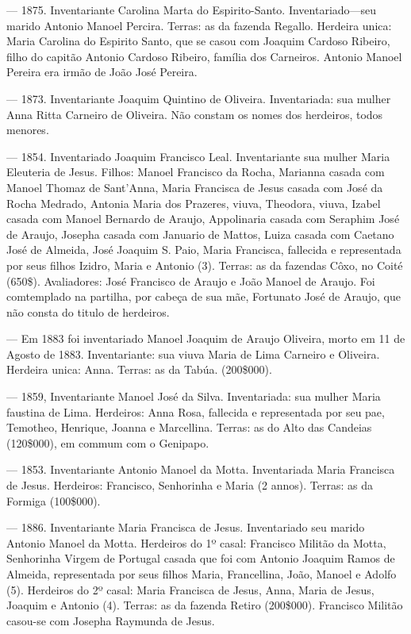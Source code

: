 — 1875. Inventariante Carolina Marta do Espirito-Santo. Inventariado—seu marido Antonio Manoel Percira. Terras: as da fazenda Regallo. Herdeira unica: Maria Carolina do Espirito Santo, que se casou com Joaquim Cardoso Ribeiro, filho do capitão Antonio Cardoso Ribeiro, família dos Carneiros. Antonio Manoel Pereira era irmão de João José Pereira.

— 1873. Inventariante Joaquim Quintino de Oliveira. Inventariada: sua mulher Anna Ritta Carneiro de Oliveira. Não constam os nomes dos herdeiros, todos menores.

— 1854. Inventariado Joaquim Francisco Leal. Inventariante sua mulher Maria Eleuteria de Jesus. Filhos: Manoel Francisco da Rocha, Marianna casada com Manoel Thomaz de Sant'Anna, Maria Francisca de Jesus casada com José da Rocha Medrado, Antonia Maria dos Prazeres, viuva, Theodora, viuva, Izabel casada com Manoel Bernardo de Araujo, Appolinaria casada com Seraphim José de Araujo, Josepha casada com Januario de Mattos, Luiza casada com Caetano José de Almeida, José Joaquim S. Paio, Maria Francisca, fallecida e representada por seus filhos Izidro, Maria e Antonio (3). Terras: as da fazendas Côxo, no Coité (650\$). Avaliadores: José Francisco de Araujo e João Manoel de Araujo. Foi comtemplado na partilha, por cabeça de sua mãe, Fortunato José de Araujo, que não consta do titulo de herdeiros.

— Em 1883 foi inventariado Manoel Joaquim de Araujo Oliveira, morto em 11 de Agosto de 1883. Inventariante: sua viuva Maria de Lima Carneiro e Oliveira. Herdeira unica: Anna. Terras: as da Tabúa. (200\$000).

— 1859, Inventariante Manoel José da Silva. Inventariada: sua mulher Maria faustina de Lima. Herdeiros: Anna Rosa, fallecida e representada por seu pae, Temotheo, Henrique, Joanna e Marcellina. Terras: as do Alto das Candeias (120\$000), em commum com o Genipapo.

— 1853. Inventariante Antonio Manoel da Motta. Inventariada Maria Francisca de Jesus. Herdeiros: Francisco, Senhorinha e Maria (2 annos). Terras: as da Formiga (100\$000).

— 1886. Inventariante Maria Francisca de Jesus. Inventariado seu marido Antonio Manoel da Motta. Herdeiros do 1º casal: Francisco Militão da Motta, Senhorinha Virgem de Portugal casada que foi com Antonio Joaquim Ramos de Almeida, representada por seus filhos Maria, Francellina, João, Manoel e Adolfo (5). Herdeiros do 2º casal: Maria Francisca de Jesus, Anna, Maria de Jesus, Joaquim e Antonio (4). Terras: as da fazenda Retiro (200\$000). Francisco Militão casou-se com Josepha Raymunda de Jesus.

